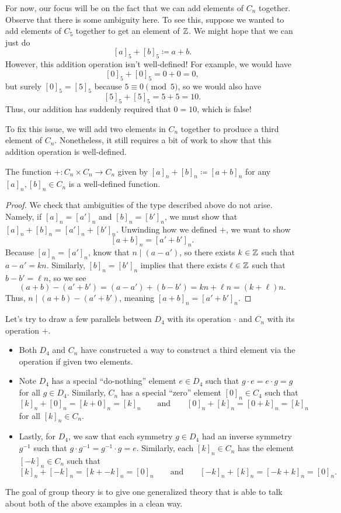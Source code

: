 \documentclass[../main.tex]{subfiles}
\begin{document}
For now, our focus will be on the fact that we can add elements of $C_n$ together. Observe that there is some ambiguity here. To see this, suppose we wanted to add elements of $C_5$ together to get an element of $\mathbb Z$. We might hope that we can just do
\[[a]_5+[b]_5\coloneqq a+b.\]
However, this addition operation isn't well-defined! For example, we would have
\[[0]_5+[0]_5=0+0=0,\]
but surely $[0]_5=[5]_5$ because $5\equiv0\pmod5$, so we would also have
\[[5]_5+[5]_5=5+5=10.\]
Thus, our addition has suddenly required that $0=10$, which is false!

To fix this issue, we will add two elements in $C_n$ together to produce a third element of $C_n$. Nonetheless, it still requires a bit of work to show that this addition operation is well-defined.
\begin{lemma}
    The function $+\colon C_n\times C_n\to C_n$ given by $[a]_n+[b]_n\coloneqq[a+b]_n$ for any $[a]_n,[b]_n\in C_n$ is a well-defined function.
\end{lemma}
\begin{proof}
    We check that ambiguities of the type described above do not arise. Namely, if $[a]_n=[a']_n$ and $[b]_n=[b']_n$, we must show that $[a]_n+[b]_n=[a']_n+[b']_n$. Unwinding how we defined $+$, we want to show
    \[[a+b]_n=[a'+b']_n.\]
    Because $[a]_n=[a']_n$, know that $n\mid(a-a')$, so there exists $k\in\mathbb Z$ such that $a-a'=kn$. Similarly, $[b]_n=[b']_n$ implies that there exists $\ell\in\mathbb Z$ such that $b-b'=\ell n$, so we see
    \[(a+b)-(a'+b')=(a-a')+(b-b')=kn+\ell n=(k+\ell)n.\]
    Thus, $n\mid(a+b)-(a'+b')$, meaning $[a+b]_n=[a'+b']_n$.
\end{proof}
Let's try to draw a few parallels between $D_4$ with its operation $\cdot$ and $C_n$ with its operation $+$.
\begin{itemize}
    \item Both $D_4$ and $C_n$ have constructed a way to construct a third element via the operation if given two elements.
    \item Note $D_4$ has a special ``do-nothing'' element $e\in D_4$ such that $g\cdot e=e\cdot g=g$ for all $g\in D_4$. Similarly, $C_n$ has a special ``zero'' element $[0]_n\in C_4$ such that
    \[[k]_n+[0]_n=[k+0]_n=[k]_n\qquad\text{and}\qquad[0]_n+[k]_n=[0+k]_n=[k]_n\]
    for all $[k]_n\in C_n$.
    \item Lastly, for $D_4$, we saw that each symmetry $g\in D_4$ had an inverse symmetry $g^{-1}$ such that $g\cdot g^{-1}=g^{-1}\cdot g=e$. Similarly, each $[k]_n\in C_n$ has the element $[-k]_n\in C_n$ such that
    \[[k]_n+[-k]_n=[k+-k]_n=[0]_n\qquad\text{and}\qquad[-k]_n+[k]_n=[-k+k]_n=[0]_n.\]
\end{itemize}
The goal of group theory is to give one generalized theory that is able to talk about both of the above examples in a clean way.
\end{document}
